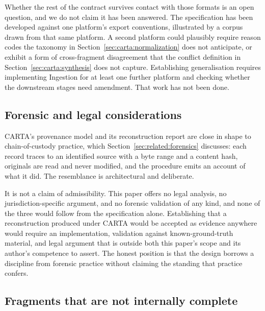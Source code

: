 Whether the rest of the contract survives contact with those formats is an open
question, and we do not claim it has been answered. The specification has been
developed against one platform's export conventions, illustrated by a corpus drawn
from that same platform. A second platform could plausibly require reason codes
the taxonomy in Section~\ref{sec:carta:normalization} does not anticipate, or
exhibit a form of cross-fragment disagreement that the conflict definition in
Section~\ref{sec:carta:synthesis} does not capture. Establishing generalisation
requires implementing Ingestion for at least one further platform and checking
whether the downstream stages need amendment. That work has not been done.

\subsection{Forensic and legal considerations}
\label{sec:discussion:forensic}

CARTA's provenance model and its reconstruction report are close in shape to
chain-of-custody practice, which Section~\ref{sec:related:forensics} discusses:
each record traces to an identified source with a byte range and a content hash,
originals are read and never modified, and the procedure emits an account of what
it did. The resemblance is architectural and deliberate.

It is not a claim of admissibility. This paper offers no legal analysis, no
jurisdiction-specific argument, and no forensic validation of any kind, and none
of the three would follow from the specification alone. Establishing that a
reconstruction produced under CARTA would be accepted as evidence anywhere would
require an implementation, validation against known-ground-truth material, and
legal argument that is outside both this paper's scope and its author's competence
to assert. The honest position is that the design borrows a discipline from
forensic practice without claiming the standing that practice confers.

\subsection{Fragments that are not internally complete}
\label{sec:discussion:incomplete}

